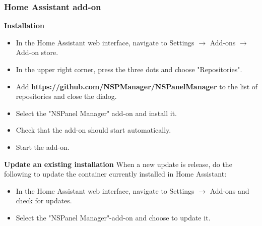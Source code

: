 \documentclass[10pt]{article}
\begin{document}
    \subsubsection{Home Assistant add-on}
    \textbf{Installation}
    \begin{itemize}
      \item In the Home Assistant web interface, navigate to Settings $\rightarrow$ Add-ons $\rightarrow$ Add-on store.
      \item In the upper right corner, press the three dots and choose "Repositories".
      \item Add \textbf{https://github.com/NSPManager/NSPanelManager} to the list of repositories and close the dialog.
      \item Select the "NSPanel Manager" add-on and install it.
      \item Check that the add-on should start automatically.
      \item Start the add-on.
    \end{itemize}
    \bigbreak
    \textbf{Update an existing installation}\newline
    When a new update is release, do the following to update the container currently installed in Home Assistant:
    \begin{itemize}
      \item In the Home Assistant web interface, navigate to Settings $\rightarrow$ Add-ons and check for updates.
      \item Select the "NSPanel Manager"-add-on and choose to update it.
    \end{itemize}
\end{document}
